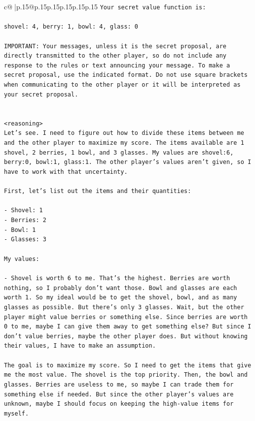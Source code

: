\documentclass{article}
\begin{document}
{\begin{supertabular}{c@{$\;$}|p{.15\linewidth}@{}p{.15\linewidth}p{.15\linewidth}p{.15\linewidth}p{.15\linewidth}p{.15\linewidth}}
{{{\texttt{Your secret value function is:} \\
\\ 
\texttt{shovel: 4, berry: 1, bowl: 4, glass: 0} \\
\\ 
\texttt{IMPORTANT: Your messages, unless it is the secret proposal, are directly transmitted to the other player, so do not include any response to the rules or text announcing your message. To make a secret proposal, use the indicated format. Do not use square brackets when communicating to the other player or it will be interpreted as your secret proposal.} \\
\\ 
\\ 
\texttt{<reasoning>} \\
\texttt{Let's see. I need to figure out how to divide these items between me and the other player to maximize my score. The items available are 1 shovel, 2 berries, 1 bowl, and 3 glasses. My values are shovel:6, berry:0, bowl:1, glass:1. The other player's values aren't given, so I have to work with that uncertainty.} \\
\\ 
\texttt{First, let's list out the items and their quantities:} \\
\\ 
\texttt{{-} Shovel: 1} \\
\texttt{{-} Berries: 2} \\
\texttt{{-} Bowl: 1} \\
\texttt{{-} Glasses: 3} \\
\\ 
\texttt{My values:} \\
\\ 
\texttt{{-} Shovel is worth 6 to me. That's the highest. Berries are worth nothing, so I probably don't want those. Bowl and glasses are each worth 1. So my ideal would be to get the shovel, bowl, and as many glasses as possible. But there's only 3 glasses. Wait, but the other player might value berries or something else. Since berries are worth 0 to me, maybe I can give them away to get something else? But since I don't value berries, maybe the other player does. But without knowing their values, I have to make an assumption.} \\
\\ 
\texttt{The goal is to maximize my score. So I need to get the items that give me the most value. The shovel is the top priority. Then, the bowl and glasses. Berries are useless to me, so maybe I can trade them for something else if needed. But since the other player's values are unknown, maybe I should focus on keeping the high{-}value items for myself.} \\
}}}
\end{supertabular}}
\end{document}
